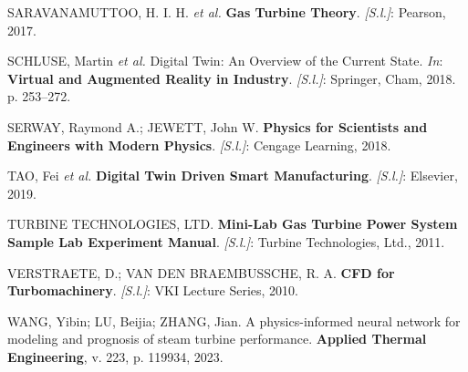 \documentclass[
  12pt,
  oneside,
  a4paper,
  english,
  brazil]{abntex2}
\newlength{\cslhangindent}
\newenvironment{CSLReferences}[2] %
 {\begin{list}{}{%
  \setlength{\itemindent}{0pt}
  \setlength{\leftmargin}{0pt}
  \setlength{\parsep}{0pt}
  \ifodd #1
   \setlength{\leftmargin}{\cslhangindent}
   \setlength{\itemindent}{-1\cslhangindent}
  \fi
  \setlength{\itemsep}{#2\baselineskip}}}
 {\end{list}}
\begin{document}
\begin{CSLReferences}{0}{1}
SARAVANAMUTTOO, H. I. H. \emph{et al.} \textbf{Gas Turbine Theory}.
\emph{{[}S.l.{]}}: Pearson, 2017.

SCHLUSE, Martin \emph{et al.} Digital Twin: An Overview of the Current
State. \emph{In}: \textbf{Virtual and Augmented Reality in Industry}.
\emph{{[}S.l.{]}}: Springer, Cham, 2018. p. 253--272.

SERWAY, Raymond A.; JEWETT, John W. \textbf{Physics for Scientists and
Engineers with Modern Physics}. \emph{{[}S.l.{]}}: Cengage Learning,
2018.

TAO, Fei \emph{et al.} \textbf{Digital Twin Driven Smart Manufacturing}.
\emph{{[}S.l.{]}}: Elsevier, 2019.

TURBINE TECHNOLOGIES, LTD. \textbf{Mini-Lab Gas Turbine Power
System{\texttrademark} Sample Lab Experiment Manual}. \emph{{[}S.l.{]}}:
Turbine Technologies, Ltd., 2011.

VERSTRAETE, D.; VAN DEN BRAEMBUSSCHE, R. A. \textbf{CFD for
Turbomachinery}. \emph{{[}S.l.{]}}: VKI Lecture Series, 2010.

WANG, Yibin; LU, Beijia; ZHANG, Jian. A physics-informed neural network
for modeling and prognosis of steam turbine performance. \textbf{Applied
Thermal Engineering}, v. 223, p. 119934, 2023.

\end{CSLReferences}
\end{document}
